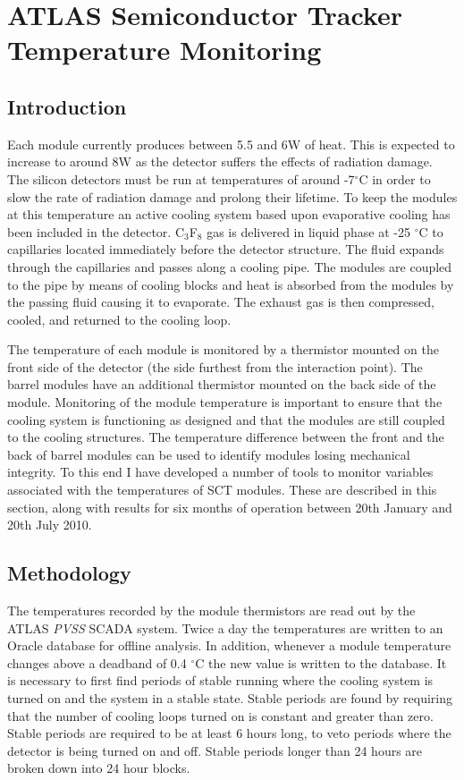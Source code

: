 \graphicspath{{Chapters/SCT/Figures/}}


\chapter{ATLAS Semiconductor Tracker Temperature Monitoring}
\label{chap:SCT}

\section{Introduction}

Each module currently produces between 5.5 and 6W of heat. This is expected to increase to around 8W as the detector suffers the effects of radiation damage. The silicon detectors must be run at temperatures of around -7$^{\circ}$C in order to slow the rate of radiation damage and prolong their lifetime. To keep the modules at this temperature an active cooling system based upon evaporative cooling has been included in the detector. C$_3$F$_8$ gas is delivered in liquid phase at -25 $^{\circ}$C to capillaries located immediately before the detector structure. The fluid expands through the capillaries and passes along a cooling pipe. The modules are coupled to the pipe by means of cooling blocks and heat is absorbed from the modules by the passing fluid causing it to evaporate. The exhaust gas is then compressed, cooled, and returned to the cooling loop.

The temperature of each module is monitored by a thermistor mounted on the front side of the detector (the side furthest from the interaction point). The barrel modules have an additional thermistor mounted on the back side of the module. Monitoring of the module temperature is important to ensure that the cooling system is functioning as designed and that the modules are still coupled to the cooling structures. The temperature difference between the front and the back of barrel modules can be used to identify modules losing mechanical integrity. To this end I have developed a number of tools to monitor variables associated with the temperatures of SCT modules. These are described in this section, along with results for six months of operation between 20th January and 20th July 2010.


\section{Methodology}
The temperatures recorded by the module thermistors are read out by the ATLAS \textit{PVSS} SCADA system. Twice a day the temperatures are written to an Oracle database for offline analysis. In addition, whenever a module temperature changes above a deadband of 0.4 $^\circ$C the new value is written to the database.
It is necessary to first find periods of stable running where the cooling system is turned on and the system in a stable state. Stable periods are found by requiring that the number of cooling loops turned on is constant and greater than zero. Stable periods are required to be at least 6 hours long, to veto periods where the detector is being turned on and off. Stable periods longer than 24 hours are broken down into 24 hour blocks.

